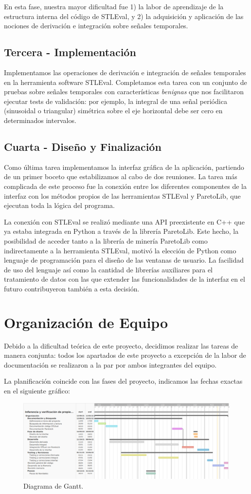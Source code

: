 	En esta fase, nuestra mayor dificultad fue 1) la labor de aprendizaje de la estructura interna del código de STLEval, y 2) la adquisición y aplicación de las nociones de derivación e integración sobre señales temporales.

\subsection{Tercera - Implementación}

	Implementamos las operaciones de derivación e integración de señales temporales en la herramienta software STLEval. Completamos esta tarea con un conjunto de pruebas sobre señales temporales con características \textit{benignas} que nos facilitaron ejecutar tests de validación: por ejemplo, la integral de una señal periódica (sinusoidal o triangular) simétrica sobre el eje horizontal debe ser cero en determinados intervalos.

\subsection{Cuarta - Diseño y Finalización}

	Como última tarea implementamos la interfaz gráfica de la aplicación, partiendo de un primer boceto que estabilizamos al cabo de dos reuniones. La tarea más complicada de este proceso fue la conexión entre los diferentes componentes de la interfaz con los métodos propios de las herramientas STLEval y ParetoLib, que ejecutan toda la lógica del programa.
	
	La conexión con STLEval se realizó mediante una API preexistente en C++ que ya estaba integrada en Python a través de la librería ParetoLib. Este hecho, la posibilidad de acceder tanto a la librería de minería ParetoLib como indirectamente a la herramienta STLEval, motivó la elección de Python como lenguaje de programación para el diseño de las ventanas de usuario. La facilidad de uso del lenguaje así como la cantidad de librerías auxiliares para el tratamiento de datos con las que extender las funcionalidades de la interfaz en el futuro contribuyeron también a esta decisión.
	


\section{Organización de Equipo}

Debido a la dificultad teórica de este proyecto, decidimos realizar las tareas de manera conjunta: todos los apartados de este proyecto a excepción de la labor de documentación se realizaron a la par por ambos integrantes del equipo. 

La planificación coincide con las fases del proyecto, indicamos las fechas exactas en el siguiente gráfico: 

\begin{figure}
\centering
  \includegraphics[width=.9\linewidth ,angle = 90,scale = 1.2]{images/gant}
\caption{Diagrama de Gantt.}
\label{fig:gant}
\end{figure}
